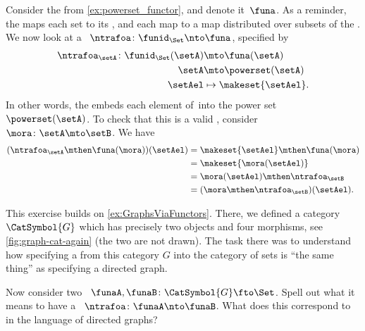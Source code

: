 \begin{example}
    Consider the   from \cref{ex:powerset_functor}, and denote it~$\funa$.
    As a reminder, the  maps each set to its , and each map to a map distributed over subsets of the .
    We now look at a ~$\ntrafoa\colon \funid_\Set \nto \funa$, specified by
    \begin{equation}
        \begin{aligned}
            \ntrafoa_\setA\colon \funid_\Set(\setA) & \mto \funa(\setA) \\
            \setA                                   & \mto \powerset(\setA) \\
            \setAel                                 & \mapsto \makeset{\setAel}.
        \end{aligned}
    \end{equation}
    In other words, the  embeds each element of~\setA into the power set~$\powerset(\setA)$.
    To check that this is a valid , consider $\mora\colon \setA\mto \setB$.
    We have
    \begin{equation}
        \begin{aligned}
            (\ntrafoa_\setA \mthen \funa(\mora))(\setAel)
             & =\makeset{\setAel} \mthen \funa(\mora) \\
             & =\makeset{\mora(\setAel)} \\
             & =\mora(\setAel)\mthen \ntrafoa_\setB \\
             & =(\mora \mthen \ntrafoa_\setB)(\setAel).
        \end{aligned}
    \end{equation}
\end{example}

\vfill

\begin{marginfigure}
    \centering
    \caption{}
    \label{fig:graph-cat-again}
\end{marginfigure}
\begin{gradedexercise}
    \label{ex:NatTrafosGraphs}
    This exercise builds on \cref{ex:GraphsViaFunctors}.
    There, we defined a category~$\CatSymbol{G}$ which has precisely two objects and four morphisms, see \cref{fig:graph-cat-again} (the two   are not drawn).
    The task there was to understand how specifying a  from this category $G$ into the category of sets is ``the same thing'' as specifying a directed graph.

    Now consider two ~$\funaA, \funaB \colon \CatSymbol{G} \fto \Set$.
    Spell out what it means to have a ~$\ntrafoa\colon \funaA \nto \funaB$.
    What does this correspond to in the language of directed graphs?
\end{gradedexercise}


